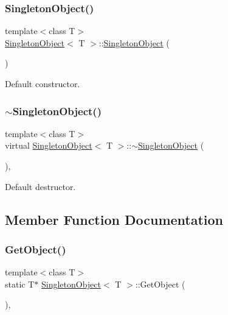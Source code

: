 \subsubsection{\texorpdfstring{Singleton\+Object()}{SingletonObject()}}
{\footnotesize\ttfamily template$<$class T$>$ \\
\mbox{\hyperlink{class_singleton_object}{Singleton\+Object}}$<$ T $>$\+::\mbox{\hyperlink{class_singleton_object}{Singleton\+Object}} (\begin{DoxyParamCaption}{ }\end{DoxyParamCaption})\hspace{0.3cm}{\ttfamily [inline]}}

Default constructor. \mbox{\label{class_singleton_object_ae8fbe0c316c1927836efd6c2712b892d}} 
\subsubsection{\texorpdfstring{$\sim$\+Singleton\+Object()}{~SingletonObject()}}
{\footnotesize\ttfamily template$<$class T$>$ \\
virtual \mbox{\hyperlink{class_singleton_object}{Singleton\+Object}}$<$ T $>$\+::$\sim$\mbox{\hyperlink{class_singleton_object}{Singleton\+Object}} (\begin{DoxyParamCaption}{ }\end{DoxyParamCaption})\hspace{0.3cm}{\ttfamily [inline]}, {\ttfamily [virtual]}}

Default destructor. 

\subsection{Member Function Documentation}
\mbox{\label{class_singleton_object_aab1f7ff4e122cf6fc49217b620d55fd8}} 
\subsubsection{\texorpdfstring{Get\+Object()}{GetObject()}}
{\footnotesize\ttfamily template$<$class T$>$ \\
static T$\ast$ \mbox{\hyperlink{class_singleton_object}{Singleton\+Object}}$<$ T $>$\+::Get\+Object (\begin{DoxyParamCaption}{ }\end{DoxyParamCaption})\hspace{0.3cm}{\ttfamily [inline]}, {\ttfamily [static]}}

